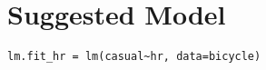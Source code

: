 \section{Suggested Model}
\label{sec:model} 

\begin{lstlisting}[frame=single] 
lm.fit_hr = lm(casual~hr, data=bicycle)
\end{lstlisting} 